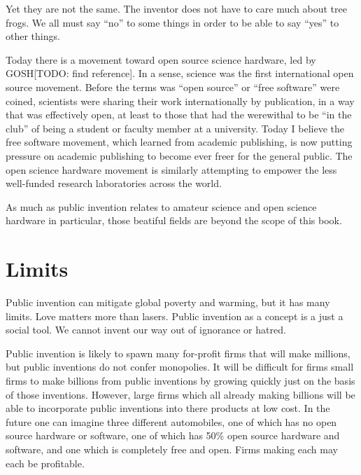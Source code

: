 \documentclass[
	fontsize=10pt, %
	twoside=false, %
	secnumdepth=1, %
]{kaobook}
\begin{document}
Yet they are not the same. The inventor does not
have to care much about tree frogs.
We all must say ``no'' to some things in order to be able to say ``yes'' to other things.

Today there is a movement toward open source science hardware, led by GOSH[TODO: find reference].
In a sense, science was the first international open source movement.
Before the terms was ``open source'' or ``free software'' were coined,
scientists were sharing their work internationally by publication,
in a way that was effectively open, at least to those that had the
werewithal to be ``in the club'' of being a student or faculty member at a
university. Today I believe the free software movement, which learned
from academic publishing, is now putting pressure on academic publishing to
become ever freer for the general public.
The open science hardware movement is similarly attempting to
empower the less well-funded research laboratories across the world.

As much as public invention relates to amateur science and
open science hardware in particular, those beatiful fields
are beyond the scope of this book.

\chapter{Limits}

Public invention can mitigate global poverty and warming,
but it has many limits.
Love matters more than lasers.
Public invention as a concept is a just a social tool.
We cannot invent our way out of ignorance or hatred.

Public invention is likely to spawn many for-profit firms that will make millions,
but public inventions do not confer monopolies.
It will be difficult for firms small firms to make billions from public inventions
by growing quickly just on the basis of those inventions.
However, large firms which all already making billions will be able to incorporate
public inventions into there products at low cost. In the future one can imagine
three different automobiles, one of which has no open source hardware or software,
one of which has 50\% open source hardware and software, and one which is
completely free and open. Firms making each may each be profitable.
\end{document}

